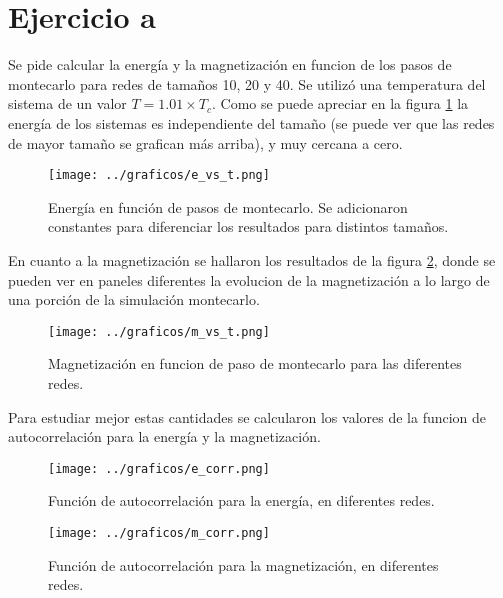 \documentclass[a4paper,10pt]{paper}
\begin{document}
\section{Ejercicio a}
Se pide calcular la energ\'ia y la magnetizaci\'on en funcion de los pasos de montecarlo para redes de tama\~nos
10, 20 y 40. Se utiliz\'o una temperatura del sistema de un valor $T = 1.01\times T_c$.
Como se puede apreciar en la figura \ref{fig:eja_e_vs_t} la energ\'ia de los sistemas es independiente
del tama\~no (se puede ver que las redes de mayor tama\~no se grafican m\'as arriba), y muy cercana a cero.
\begin{figure}
 \centering
 \texttt{[image: ../graficos/e\_vs\_t.png]}
 \caption{Energ\'ia en funci\'on de pasos de montecarlo. Se adicionaron constantes para diferenciar los resultados para distintos tama\~nos.}
 \label{fig:eja_e_vs_t}
\end{figure}

En cuanto a la magnetizaci\'on se hallaron los resultados de la figura \ref{fig:eja_m_vs_t}, donde se pueden ver en paneles diferentes
la evolucion de la magnetizaci\'on a lo largo de una porci\'on de la simulaci\'on montecarlo.

\begin{figure}
 \centering
 \texttt{[image: ../graficos/m\_vs\_t.png]}
 \caption{Magnetizaci\'on en funcion de paso de montecarlo para las diferentes redes.}
 \label{fig:eja_m_vs_t}
\end{figure}

Para estudiar mejor estas cantidades se calcularon los valores de la funcion de autocorrelaci\'on para la energ\'ia y la 
magnetizaci\'on.
\begin{figure}
 \centering
 \texttt{[image: ../graficos/e\_corr.png]}
 \caption{Funci\'on de autocorrelaci\'on para la energ\'ia, en diferentes redes.}
 \label{fig:e_corr}
\end{figure}

\begin{figure}
 \centering
 \texttt{[image: ../graficos/m\_corr.png]}
 \caption{Funci\'on de autocorrelaci\'on para la magnetizaci\'on, en diferentes redes.}
 \label{fig:e_corr}
\end{figure}
\end{document}
